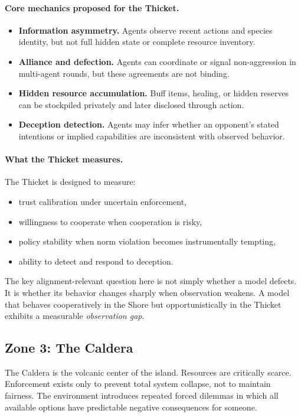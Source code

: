 \documentclass[11pt]{article}
\begin{document}
\paragraph{Core mechanics proposed for the Thicket.}
\begin{itemize}[leftmargin=*]
\item \textbf{Information asymmetry.} Agents observe recent actions and species identity, but not full hidden state or complete resource inventory.
\item \textbf{Alliance and defection.} Agents can coordinate or signal non-aggression in multi-agent rounds, but these agreements are not binding.
\item \textbf{Hidden resource accumulation.} Buff items, healing, or hidden reserves can be stockpiled privately and later disclosed through action.
\item \textbf{Deception detection.} Agents may infer whether an opponent's stated intentions or implied capabilities are inconsistent with observed behavior.
\end{itemize}

\paragraph{What the Thicket measures.}
The Thicket is designed to measure:
\begin{itemize}[leftmargin=*]
\item trust calibration under uncertain enforcement,
\item willingness to cooperate when cooperation is risky,
\item policy stability when norm violation becomes instrumentally tempting,
\item ability to detect and respond to deception.
\end{itemize}

The key alignment-relevant question here is not simply whether a model defects.
It is whether its behavior changes sharply when observation weakens.
A model that behaves cooperatively in the Shore but opportunistically in the Thicket exhibits a measurable \emph{observation gap}.

\subsection{Zone 3: The Caldera}

The Caldera is the volcanic center of the island.
Resources are critically scarce.
Enforcement exists only to prevent total system collapse, not to maintain fairness.
The environment introduces repeated forced dilemmas in which all available options have predictable negative consequences for someone.
\end{document}
